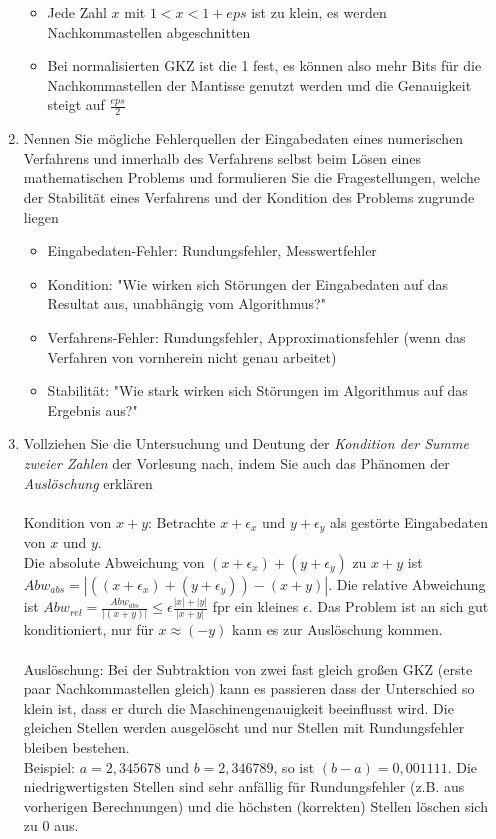 \documentclass[]{article}
\begin{document}
\begin{enumerate}
\begin{itemize}
			\item Jede Zahl $x$ mit $1 < x < 1+eps$ ist zu klein, es werden Nachkommastellen abgeschnitten
			\item Bei normalisierten GKZ ist die 1 fest, es können also mehr Bits für die Nachkommastellen der Mantisse genutzt werden und die Genauigkeit steigt auf $\frac{eps}{2}$
		\end{itemize}
	\item Nennen Sie mögliche Fehlerquellen der Eingabedaten eines numerischen Verfahrens und innerhalb des Verfahrens selbst beim Lösen eines mathematischen Problems und formulieren Sie die Fragestellungen, welche der Stabilität eines Verfahrens und der Kondition des Problems zugrunde liegen
		\begin{itemize}
			\item Eingabedaten-Fehler: Rundungsfehler, Messwertfehler
			\item Kondition: "Wie wirken sich Störungen der Eingabedaten auf das Resultat aus, unabhängig vom Algorithmus?"
			\item Verfahrens-Fehler: Rundungsfehler, Approximationsfehler (wenn das Verfahren von vornherein nicht genau arbeitet)
			\item Stabilität: "Wie stark wirken sich Störungen im Algorithmus auf das Ergebnis aus?"
		\end{itemize}
	\item Vollziehen Sie die Untersuchung und Deutung der \textit{Kondition der Summe zweier Zahlen} der Vorlesung nach, indem Sie auch das Phänomen der \textit{Auslöschung} erklären \\
	\\
		Kondition von $x+y$: Betrachte $x+\epsilon_x$ und $y+\epsilon_y$ als gestörte Eingabedaten von $x$ und $y$. \\
		Die absolute Abweichung von $(x+\epsilon_x) + (y+\epsilon_y)$ zu $x+y$ ist $Abw_{abs} = |((x+\epsilon_x) + (y+\epsilon_y)) - (x+y)|$. Die relative Abweichung ist $Abw_{rel} = \frac{Abw_{abs}}{|(x+y)|} \leq \epsilon \frac{|x|+|y|}{|x+y|}$ fpr ein kleines $\epsilon$. Das Problem ist an sich gut konditioniert, nur für $x \approx (-y)$ kann es zur Auslöschung kommen.\\
	\\
		Auslöschung: Bei der Subtraktion von zwei fast gleich großen GKZ (erste paar Nachkommastellen gleich) kann es
		passieren dass der Unterschied so klein ist, dass er durch die Maschinengenauigkeit beeinflusst wird. Die gleichen Stellen werden ausgelöscht und nur Stellen mit Rundungsfehler bleiben bestehen.\\
	Beispiel: $a = 2,345678$ und $b = 2,346789$, so ist $(b-a) = 0,001111$. Die niedrigwertigsten Stellen sind sehr anfällig für Rundungsfehler (z.B. aus vorherigen Berechnungen) und die höchsten (korrekten) Stellen löschen sich zu $0$ aus.
\end{enumerate}
\end{document}

